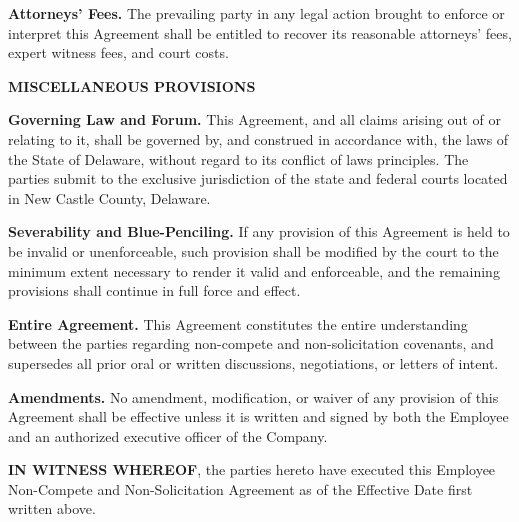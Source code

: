 \documentclass[11pt,a4paper]{article}
\begin{document}
\begin{clauses}
\begin{clauses}
        \item \textbf{Attorneys' Fees.} The prevailing party in any legal action brought to enforce or interpret this Agreement shall be entitled to recover its reasonable attorneys' fees, expert witness fees, and court costs.
    \end{clauses}

    \item \textbf{MISCELLANEOUS PROVISIONS}
    \label{sec:miscellaneous}
    
    \begin{clauses}
        \item \textbf{Governing Law and Forum.} This Agreement, and all claims arising out of or relating to it, shall be governed by, and construed in accordance with, the laws of the State of Delaware, without regard to its conflict of laws principles. The parties submit to the exclusive jurisdiction of the state and federal courts located in New Castle County, Delaware.
        
        \item \textbf{Severability and Blue-Penciling.} If any provision of this Agreement is held to be invalid or unenforceable, such provision shall be modified by the court to the minimum extent necessary to render it valid and enforceable, and the remaining provisions shall continue in full force and effect.
        
        \item \textbf{Entire Agreement.} This Agreement constitutes the entire understanding between the parties regarding non-compete and non-solicitation covenants, and supersedes all prior oral or written discussions, negotiations, or letters of intent.
        
        \item \textbf{Amendments.} No amendment, modification, or waiver of any provision of this Agreement shall be effective unless it is written and signed by both the Employee and an authorized executive officer of the Company.
    \end{clauses}
\end{clauses}

\vspace{4ex}
\noindent
\textbf{IN WITNESS WHEREOF}, the parties hereto have executed this Employee Non-Compete and Non-Solicitation Agreement as of the Effective Date first written above.

\vspace{6ex}
\end{document}
